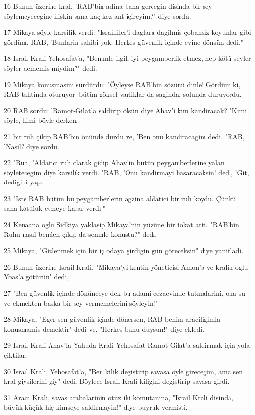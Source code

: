 \par 16 Bunun üzerine kral, "RAB'bin adina bana gerçegin disinda bir sey söylemeyecegine iliskin sana kaç kez ant içireyim?" diye sordu.
\par 17 Mikaya söyle karsilik verdi: "Israilliler'i daglara dagilmis çobansiz koyunlar gibi gördüm. RAB, 'Bunlarin sahibi yok. Herkes güvenlik içinde evine dönsün dedi."
\par 18 Israil Krali Yehosafat'a, "Benimle ilgili iyi peygamberlik etmez, hep kötü seyler söyler dememis miydim?" dedi.
\par 19 Mikaya konusmasini sürdürdü: "Öyleyse RAB'bin sözünü dinle! Gördüm ki, RAB tahtinda oturuyor, bütün göksel varliklar da saginda, solunda duruyordu.
\par 20 RAB sordu: 'Ramot-Gilat'a saldirip ölsün diye Ahav'i kim kandiracak? "Kimi söyle, kimi böyle derken,
\par 21 bir ruh çikip RAB'bin önünde durdu ve, 'Ben onu kandiracagim dedi. "RAB, 'Nasil? diye sordu.
\par 22 "Ruh, 'Aldatici ruh olarak gidip Ahav'in bütün peygamberlerine yalan söyletecegim diye karsilik verdi. "RAB, 'Onu kandirmayi basaracaksin! dedi, 'Git, dedigini yap.
\par 23 "Iste RAB bütün bu peygamberlerin agzina aldatici bir ruh koydu. Çünkü sana kötülük etmeye karar verdi."
\par 24 Kenaana oglu Sidkiya yaklasip Mikaya'nin yüzüne bir tokat atti. "RAB'bin Ruhu nasil benden çikip da seninle konustu?" dedi.
\par 25 Mikaya, "Gizlenmek için bir iç odaya girdigin gün göreceksin" diye yanitladi.
\par 26 Bunun üzerine Israil Krali, "Mikaya'yi kentin yöneticisi Amon'a ve kralin oglu Yoas'a götürün" dedi,
\par 27 "Ben güvenlik içinde dönünceye dek bu adami cezaevinde tutmalarini, ona su ve ekmekten baska bir sey vermemelerini söyleyin!"
\par 28 Mikaya, "Eger sen güvenlik içinde dönersen, RAB benim araciligimla konusmamis demektir" dedi ve, "Herkes bunu duysun!" diye ekledi.
\par 29 Israil Krali Ahav'la Yahuda Krali Yehosafat Ramot-Gilat'a saldirmak için yola çiktilar.
\par 30 Israil Krali, Yehosafat'a, "Ben kilik degistirip savasa öyle girecegim, ama sen kral giysilerini giy" dedi. Böylece Israil Krali kiligini degistirip savasa girdi.
\par 31 Aram Krali, savas arabalarinin otuz iki komutanina, "Israil Krali disinda, büyük küçük hiç kimseye saldirmayin!" diye buyruk vermisti.
